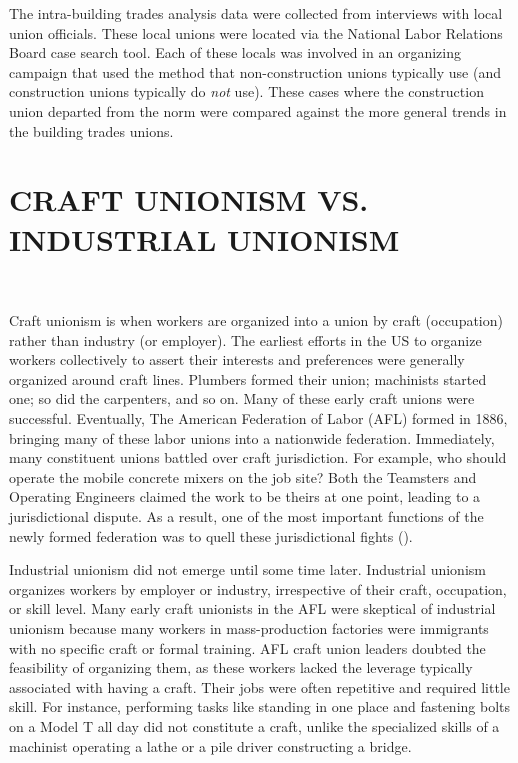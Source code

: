 \documentclass[12pt]{article}
\begin{document}
The intra-building trades analysis data were collected from interviews with local union officials. These local unions were located via the National Labor Relations Board case search tool. Each of these locals was involved in an organizing campaign that used the method that non-construction unions typically use (and construction unions typically do \textit{not} use). These cases where the construction union departed from the norm were compared against the more general trends in the building trades unions.

\section{CRAFT UNIONISM VS. INDUSTRIAL UNIONISM} \

Craft unionism is when workers are organized into a union by craft (occupation) rather than industry (or employer). The earliest efforts in the US to organize workers collectively to assert their interests and preferences were generally organized around craft lines. Plumbers formed their union; machinists started one; so did the carpenters, and so on. Many of these early craft unions were successful. Eventually, The American Federation of Labor (AFL) formed in 1886, bringing many of these labor unions into a nationwide federation. Immediately, many constituent unions battled over craft jurisdiction. For example, who should operate the mobile concrete mixers on the job site? Both the Teamsters and Operating Engineers claimed the work to be theirs at one point, leading to a jurisdictional dispute. As a result, one of the most important functions of the newly formed federation was to quell these jurisdictional fights (\cite{jaffe1940}).


Industrial unionism did not emerge until some time later. Industrial unionism organizes workers by employer or industry, irrespective of their craft, occupation, or skill level. Many early craft unionists in the AFL were skeptical of industrial unionism because many workers in mass-production factories were immigrants with no specific craft or formal training. AFL craft union leaders doubted the feasibility of organizing them, as these workers lacked the leverage typically associated with having a craft. Their jobs were often repetitive and required little skill. For instance, performing tasks like standing in one place and fastening bolts on a Model T all day did not constitute a craft, unlike the specialized skills of a machinist operating a lathe or a pile driver constructing a bridge.
\end{document}

